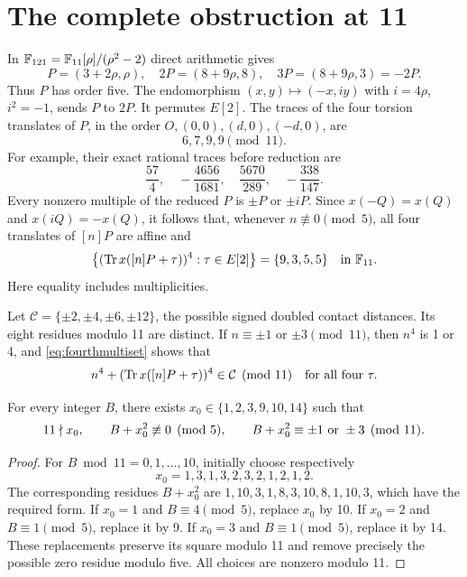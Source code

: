 \documentclass[11pt,a4paper]{article}
\begin{document}
\section{The complete obstruction at 11}
In $\mathbb F_{121}=\mathbb F_{11}[\rho]/(\rho^2-2)$ direct arithmetic gives
\begin{equation}\label{eq:p11}
 P=(3+2\rho,\rho),\quad
 2P=(8+9\rho,8),\quad 3P=(8+9\rho,3)=-2P.
\end{equation}
Thus $P$ has order five. The endomorphism $(x,y)\mapsto(-x,iy)$ with
$i=4\rho$, $i^2=-1$, sends $P$ to $2P$. It permutes $E[2]$.
The traces of the four torsion translates of $P$, in the order
$O,(0,0),(d,0),(-d,0)$, are
\[
                             6,7,9,9\pmod {11}.
\]
For example, their exact rational traces before reduction are
\[
 \frac{57}{4},\quad-\frac{4656}{1681},\quad
 \frac{5670}{289},\quad-\frac{338}{147}.
\]
Every nonzero multiple of the reduced $P$ is $\pm P$ or $\pm iP$.
Since $x(-Q)=x(Q)$ and $x(iQ)=-x(Q)$, it follows that, whenever
$n\not\equiv0\pmod5$, all four translates of $[n]P$ are affine and
\begin{equation}\label{eq:fourthmultiset}
 \bigl\{(\operatorname{Tr} x([n]P+\tau))^4:\tau\in E[2]\bigr\}
                         =\{9,3,5,5\}\quad\hbox{in }\mathbb F_{11}.
\end{equation}
Here equality includes multiplicities.

Let $\mathcal C=\{\pm2,\pm4,\pm6,\pm12\}$, the possible signed doubled
contact distances. Its eight residues modulo 11 are distinct. If
$n\equiv\pm1$ or $\pm3\pmod {11}$, then $n^4$ is 1 or 4, and
\eqref{eq:fourthmultiset} shows that
\begin{equation}\label{eq:allcontacts}
 n^4+(\operatorname{Tr} x([n]P+\tau))^4\in\mathcal C\pmod {11}
                 \quad\hbox{for all four }\tau.
\end{equation}

\begin{lemma}\label{lem:smallinput}
For every integer $B$, there exists $x_0\in\{1,2,3,9,10,14\}$ such that
\[
 11\nmid x_0,\qquad B+x_0^2\not\equiv0\pmod5,
 \qquad B+x_0^2\equiv\pm1\hbox{ or }\pm3\pmod {11}.
\]
\end{lemma}
\begin{proof}
For $B\bmod11=0,1,\ldots,10$, initially choose respectively
\[
                       x_0=1,3,1,3,2,3,2,1,2,1,2.
\]
The corresponding residues $B+x_0^2$ are
$1,10,3,1,8,3,10,8,1,10,3$, which have the required form.
If $x_0=1$ and $B\equiv4\pmod5$, replace $x_0$ by 10.
If $x_0=2$ and $B\equiv1\pmod5$, replace it by 9.
If $x_0=3$ and $B\equiv1\pmod5$, replace it by 14.
These replacements preserve its square modulo 11 and remove precisely
the possible zero residue modulo five. All choices are nonzero modulo 11.
\end{proof}
\end{document}
